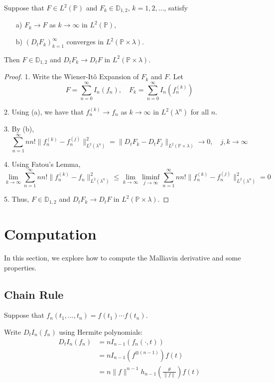 \begin{theorem}
Suppose that $F \in L^2(\mathbb{P})$ and $F_k \in \mathbb{D}_{1,2}$, $k = 1, 2, \ldots$, satisfy

\begin{enumerate}
	\item[a)] $F_k \to F$ as $k \to \infty$ in $L^2(\mathbb{P})$, 
	\item[b)] $(D_t F_k)_{k=1}^\infty$ converges in $L^2(\mathbb{P} \times \lambda)$.
\end{enumerate}

Then $F \in \mathbb{D}_{1,2}$ and $D_t F_k \to D_t F$ in $L^2(\mathbb{P} \times \lambda)$.
\end{theorem}

\begin{proof} 
1. Write the Wiener-Itô Expansion of $F_k$ and $F$. Let
$$
F = \sum_{n=0}^\infty I_n(f_n), \quad F_k = \sum_{n=0}^\infty I_n(f_n^{(k)})
$$

2. Using (a), we have that $f_n^{(k)} \to f_n$ as $k \to \infty$ in $L^2(\lambda^n)$ for all $n$.

3. By (b), 
$$
\sum_{n=1}^\infty n n! \| f_n^{(k)} - f_n^{(j)} \|_{L^2(\lambda^n)}^2 = \| D_t F_k - D_t F_j \|_{L^2(\mathbb{P} \times \lambda)} \longrightarrow 0, \quad j,k \to \infty
$$

4. Using Fatou's Lemma,
$$
\lim_{k \to \infty} \sum_{n=1}^\infty n n! \| f_n^{(k)} - f_n \|_{L^2(\lambda^n)}^2 \le \lim_{k \to \infty} \liminf_{j \to \infty} \sum_{n=1}^\infty n n! \| f_n^{(k)} - f_n^{(j)} \|_{L^2(\lambda^n)}^2 = 0 
$$

5. Thus, $F \in \mathbb{D}_{1,2}$ and $D_t F_k \to D_t F$ in $L^2(\mathbb{P} \times \lambda)$.
\end{proof}

\section{Computation} 

In this section, we explore how to compute the Malliavin derivative and some properties.  

\subsection{Chain Rule} 

Suppose that $f_n(t_1, \ldots, t_n) = f(t_1) \cdots f(t_n)$.

Write $D_t I_n(f_n)$ using Hermite polynomials:
\begin{equation*}
\begin{aligned}
	D_t I_n(f_n) &= n I_{n-1}(f_n(\cdot, t)) \\
		     &= n I_{n-1}(f^{\otimes (n-1)})f(t) \\
		     &= n \| f \|^{n-1} h_{n-1} \left( \frac{\theta}{\| f \|} \right) f(t)
\end{aligned}
\end{equation*}

